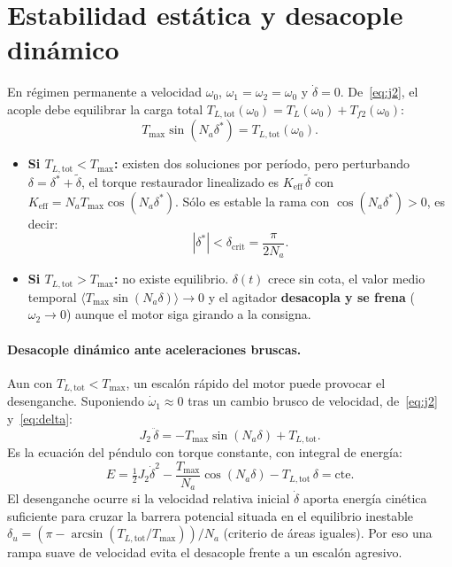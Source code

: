 \documentclass[11pt,a4paper,oneside]{report}
\theoremstyle{definition}
\theoremstyle{remark}
\begin{document}
\section{Estabilidad estática y desacople dinámico}
En régimen permanente a velocidad $\omega_0$, $\omega_1=\omega_2=\omega_0$ y
$\dot\delta=0$. De~\eqref{eq:j2}, el acople debe equilibrar la carga total
$T_{L,\text{tot}}(\omega_0) = T_L(\omega_0) + T_{f2}(\omega_0)$:
\begin{equation}
  T_{\max}\sin(N_a\delta^\ast) = T_{L,\text{tot}}(\omega_0).
  \label{eq:eq_acople}
\end{equation}
\begin{itemize}
  \item \textbf{Si $T_{L,\text{tot}} < T_{\max}$:} existen dos soluciones por
        período, pero perturbando $\delta=\delta^\ast+\tilde\delta$, el torque
        restaurador linealizado es $K_{\text{eff}}\,\tilde\delta$ con
        $K_{\text{eff}} = N_a T_{\max}\cos(N_a\delta^\ast)$. Sólo es estable la
        rama con $\cos(N_a\delta^\ast)>0$, es decir:
        \begin{equation}
          |\delta^\ast| < \delta_{\text{crit}} = \frac{\pi}{2N_a}.
        \end{equation}
  \item \textbf{Si $T_{L,\text{tot}} > T_{\max}$:} no existe equilibrio.
        $\delta(t)$ crece sin cota, el valor medio temporal
        $\langle T_{\max}\sin(N_a\delta)\rangle \to 0$ y el agitador
        \textbf{desacopla y se frena} ($\omega_2 \to 0$) aunque el motor siga
        girando a la consigna.
\end{itemize}

\paragraph{Desacople dinámico ante aceleraciones bruscas.} Aun con
$T_{L,\text{tot}} < T_{\max}$, un escalón rápido del motor puede provocar el
desenganche. Suponiendo $\dot\omega_1 \approx 0$ tras un cambio brusco de
velocidad, de~\eqref{eq:j2} y~\eqref{eq:delta}:
\begin{equation}
  J_2\,\ddot\delta = -T_{\max}\sin(N_a\delta) + T_{L,\text{tot}}.
  \label{eq:pendulo}
\end{equation}
Es la ecuación del péndulo con torque constante, con integral de energía:
\begin{equation}
  E = \tfrac{1}{2}J_2\dot\delta^2 - \frac{T_{\max}}{N_a}\cos(N_a\delta) - T_{L,\text{tot}}\,\delta = \text{cte}.
\end{equation}
El desenganche ocurre si la velocidad relativa inicial $\dot\delta$ aporta
energía cinética suficiente para cruzar la barrera potencial situada en el
equilibrio inestable $\delta_u = (\pi - \arcsin(T_{L,\text{tot}}/T_{\max}))/N_a$
(criterio de áreas iguales). Por eso una rampa suave de velocidad evita el
desacople frente a un escalón agresivo.
\end{document}

